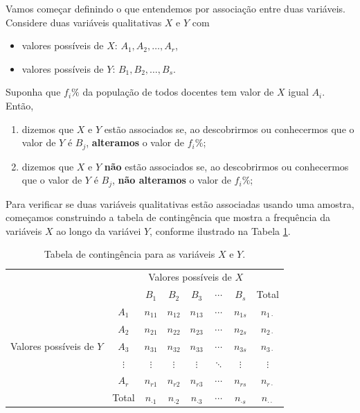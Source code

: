 \documentclass[]{article}
\providecommand{\tightlist}{%
  \setlength{\itemsep}{0pt}\setlength{\parskip}{0pt}}
\begin{document}
Vamos começar definindo o que entendemos por associação entre duas variáveis.
Considere duas variáveis qualitativas \(X\) e \(Y\) com

\begin{itemize}
\tightlist
\item
  valores possíveis de \(X\): \(A_1, A_2, \dots, A_r\),
\item
  valores possíveis de \(Y\): \(B_1, B_2, \dots, B_s\).
\end{itemize}

Suponha que \(f_i \%\) da população de todos docentes tem valor de \(X\) igual \(A_i\).
Então,

\begin{enumerate}
\def\labelenumi{\arabic{enumi}.}
\tightlist
\item
  dizemos que \(X\) e \(Y\) estão associados se, ao descobrirmos ou conhecermos que o valor de
  \(Y\) é \(B_j\), \textbf{alteramos} o valor de \(f_i \%\);
\item
  dizemos que \(X\) e \(Y\) \textbf{não} estão associados se, ao descobrirmos ou conhecermos que o valor de
  \(Y\) é \(B_j\), \textbf{não alteramos} o valor de \(f_i \%\);
\end{enumerate}

Para verificar se duas variáveis qualitativas estão associadas usando uma amostra,
começamos construindo a tabela de contingência que mostra a frequência da variáveis
\(X\) ao longo da variávei \(Y\), conforme ilustrado na Tabela \ref{tab:contingencia}.

\begin{table}[htbp]
  \centering
  \caption{Tabela de contingência para as variáveis $X$ e $Y$.}
  \label{tab:contingencia}
  \begin{tabular}{c|c|ccccc|c}
    &  & \multicolumn{5}{|c|}{Valores possíveis de $X$} & \\ \cline{3-7}
    &  & $B_1$ & $B_2$ & $B_3$ & $\cdots$ & $B_s$ & Total\\ \hline
  \multirow{5}{*}{Valores possíveis de $Y$}  & $A_1$ & $n_{11}$ & $n_{12}$ & $n_{13}$ & $\cdots$ & $n_{1s}$ & $n_{1\cdot}$ \\
    & $A_2$ & $n_{21}$ & $n_{22}$ & $n_{23}$ & $\cdots$ & $n_{2s}$ & $n_{2\cdot}$ \\
    & $A_3$ & $n_{31}$ & $n_{32}$ & $n_{33}$ & $\cdots$ & $n_{3s}$ & $n_{3\cdot}$ \\
    & $\vdots$ & $\vdots$ & $\vdots$ & $\vdots$ & $\ddots$ & $\vdots$ & $\vdots$\\
    & $A_r$ & $n_{r1}$ & $n_{r2}$ & $n_{r3}$ & $\cdots$ & $n_{rs}$ & $n_{r\cdot}$  \\ \hline
    & Total & $n_{\cdot 1}$ & $n_{\cdot 2}$ & $n_{\cdot 3}$ & $\cdots$ & $n_{\cdot s}$ & $n_{\cdot \cdot}$ 
  \end{tabular}
\end{table}
\end{document}
